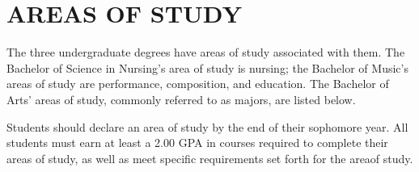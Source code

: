 \documentclass[
  letterpaper,
]{scrbook}
\begin{document}
\chapter{AREAS OF STUDY}\label{sec-areas-of-study}

The three undergraduate degrees have areas of study associated with
them. The Bachelor of Science in Nursing's area of study is nursing; the
Bachelor of Music's areas of study are performance, composition, and
education. The Bachelor of Arts' areas of study, commonly referred to as
majors, are listed below.

Students should declare an area of study by the end of their sophomore
year. All students must earn at least a 2.00 GPA in courses required to
complete their areas of study, as well as meet specific requirements set
forth for the areaof study.
\end{document}

